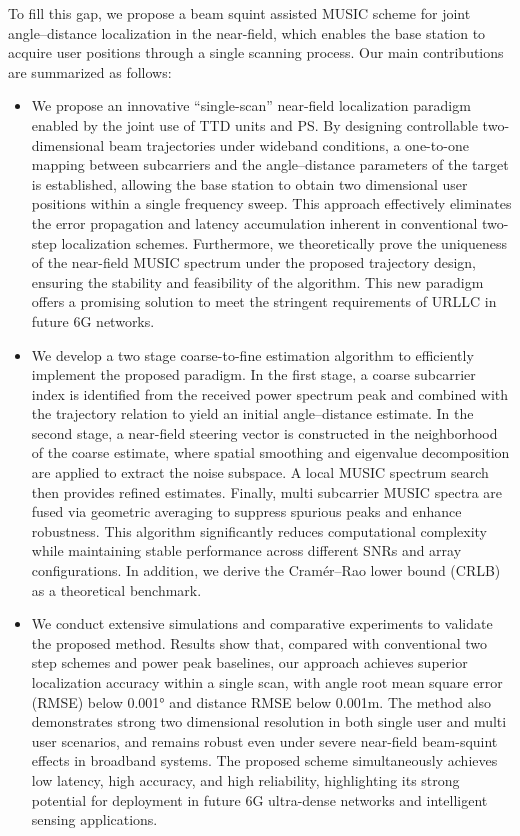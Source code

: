 \documentclass[lettersize,journal]{IEEEtran}
\begin{document}
To fill this gap, we propose a beam squint assisted MUSIC scheme for joint angle–distance localization in the near-field, which enables the base station to acquire user positions through a single scanning process. Our main contributions are summarized as follows:
  \begin{itemize}
    \item We propose an innovative “single-scan” near-field localization paradigm enabled by the joint use of TTD units and PS. By designing controllable two-dimensional beam trajectories under wideband conditions, a one-to-one mapping between subcarriers and the angle–distance parameters of the target is established, allowing the base station to obtain two dimensional user positions within a single frequency sweep. This approach effectively eliminates the error propagation and latency accumulation inherent in conventional two-step localization schemes. Furthermore, we theoretically prove the uniqueness of the near-field MUSIC spectrum under the proposed trajectory design, ensuring the stability and feasibility of the algorithm. This new paradigm offers a promising solution to meet the stringent requirements of URLLC in future 6G networks.
    \item We develop a two stage coarse-to-fine estimation algorithm to efficiently implement the proposed paradigm. In the first stage, a coarse subcarrier index is identified from the received power spectrum peak and combined with the trajectory relation to yield an initial angle–distance estimate. In the second stage, a near-field steering vector is constructed in the neighborhood of the coarse estimate, where spatial smoothing and eigenvalue decomposition are applied to extract the noise subspace. A local MUSIC spectrum search then provides refined estimates. Finally, multi subcarrier MUSIC spectra are fused via geometric averaging to suppress spurious peaks and enhance robustness. This algorithm significantly reduces computational complexity while maintaining stable performance across different SNRs and array configurations. In addition, we derive the Cramér–Rao lower bound (CRLB) as a theoretical benchmark.
    \item We conduct extensive simulations and comparative experiments to validate the proposed method. Results show that, compared with conventional two step schemes and power peak baselines, our approach achieves superior localization accuracy within a single scan, with angle root mean square error (RMSE) below 0.001° and distance RMSE below 0.001m. The method also demonstrates strong two dimensional resolution in both single user and multi user scenarios, and remains robust even under severe near-field beam-squint effects in broadband systems. The proposed scheme simultaneously achieves low latency, high accuracy, and high reliability, highlighting its strong potential for deployment in future 6G ultra-dense networks and intelligent sensing applications.
  \end{itemize}
\end{document}

